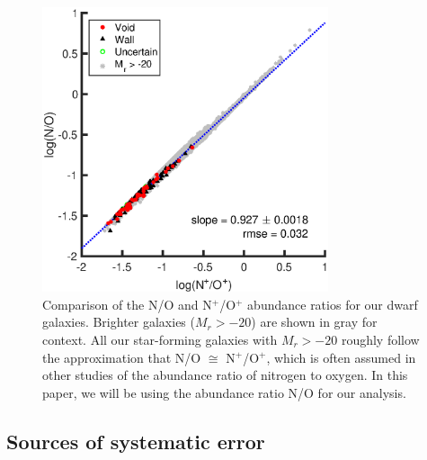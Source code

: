 \begin{figure}
    \centering
    \includegraphics[width=0.75\textwidth]{Images/Paper2/1sig_I06_dwarf_0-20_SF_t3_logNpOp_logNO_fit}
    \caption[N/O versus N$^+$/O$^+$]{Comparison of the N/O and N$^+$/O$^+$ 
    abundance ratios for our dwarf galaxies.  Brighter galaxies ($M_r > -20$) 
    are shown in gray for context.  All our star-forming galaxies with 
    $M_r > -20$ roughly follow the approximation that N/O $\cong$ N$^+$/O$^+$, 
    which is often assumed in other studies of the abundance ratio of nitrogen 
    to oxygen.  In this paper, we will be using the abundance ratio N/O for our 
    analysis.}
    \label{fig:NO_NpOp}
\end{figure}


\subsection{Sources of systematic error}

